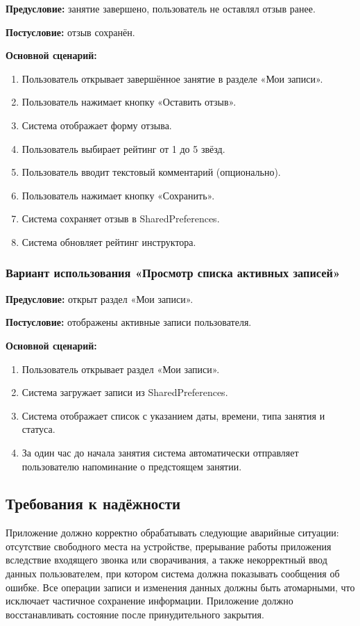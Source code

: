 \textbf{Предусловие:} занятие завершено, пользователь не оставлял отзыв ранее.

\textbf{Постусловие:} отзыв сохранён.

\textbf{Основной сценарий:}
\begin{enumerate}
	\item Пользователь открывает завершённое занятие в разделе «Мои записи».
	\item Пользователь нажимает кнопку «Оставить отзыв».
	\item Система отображает форму отзыва.
	\item Пользователь выбирает рейтинг от 1 до 5 звёзд.
	\item Пользователь вводит текстовый комментарий (опционально).
	\item Пользователь нажимает кнопку «Сохранить».
	\item Система сохраняет отзыв в SharedPreferences.
	\item Система обновляет рейтинг инструктора.
\end{enumerate}

\subsubsection{Вариант использования «Просмотр списка активных записей»}

\textbf{Предусловие:} открыт раздел «Мои записи».

\textbf{Постусловие:} отображены активные записи пользователя.

\textbf{Основной сценарий:}
\begin{enumerate}
	\item Пользователь открывает раздел «Мои записи».
	\item Система загружает записи из SharedPreferences.
	\item Система отображает список с указанием даты, времени, типа занятия и статуса.
	\item За один час до начала занятия система автоматически отправляет пользователю напоминание о предстоящем занятии.
\end{enumerate}

\subsection{Требования к надёжности}

Приложение должно корректно обрабатывать следующие аварийные ситуации: отсутствие свободного места на устройстве, прерывание работы приложения вследствие входящего звонка или сворачивания, а также некорректный ввод данных пользователем, при котором система должна показывать сообщения об ошибке. Все операции записи и изменения данных должны быть атомарными, что исключает частичное сохранение информации. Приложение должно восстанавливать состояние после принудительного закрытия.

